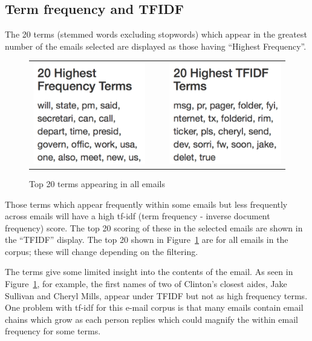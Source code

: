 \documentclass[journal]{vgtc}                %
\begin{document}
\subsection{Term frequency and TFIDF}
\label{sect:Displays:TFIDF}
The 20 terms (stemmed words excluding stopwords) which appear in the greatest number of the emails selected are displayed as those having ``Highest Frequency''.  
\begin{figure}[h]
\begin{center}
\begin{tabular}{ccc}
\includegraphics[width=0.4\linewidth]{HighFreqAll} &
$~~~~$ &
\includegraphics[width=0.4\linewidth]{HighTFIDFAll} 
\end{tabular}
\caption{Top 20 terms appearing in all emails}
\label{fig:top20all}
\end{center}
\end{figure}
Those terms which appear frequently within some emails but less frequently across emails will have a high tf-idf (term frequency - inverse document frequency) score.  The top 20 scoring of these in the selected emails are shown in the ``TFIDF'' display. 
The top 20 shown in Figure~\ref{fig:top20all} are for all emails in the corpus; these will change depending on the filtering.

The terms give some limited insight into the contents of the email.  As seen in Figure~\ref{fig:top20all}, for example, the first names of two of Clinton's closest aides, Jake Sullivan and Cheryl Mills,  appear under TFIDF but not  as high frequency terms.  One problem with tf-idf for this e-mail corpus is that many emails contain email chains which grow as each person replies which could magnify the within email frequency for some terms.
\end{document}
